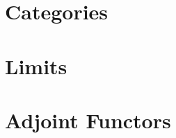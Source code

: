 \documentclass[../../deep-dive]{subfiles}
\begin{document}
\chapter{Categories}





\chapter{Limits}



\chapter{Adjoint Functors}


\end{document}
